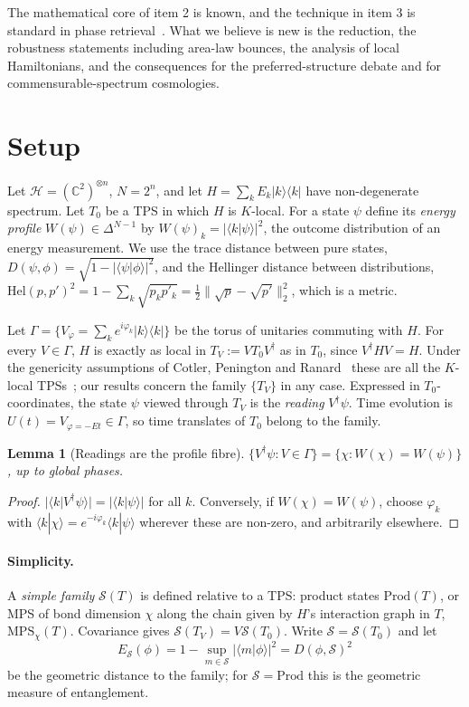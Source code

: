 \documentclass[11pt]{article}
\newtheorem{lemma}[theorem]{Lemma}
\theoremstyle{definition}
\theoremstyle{remark}
\newcommand{\ket}[1]{|#1\rangle}
\newcommand{\bra}[1]{\langle #1|}
\newcommand{\braket}[2]{\langle #1|#2\rangle}
\newcommand{\Hel}{\mathrm{Hel}}
\newcommand{\Prod}{\mathrm{Prod}}
\newcommand{\MPS}{\mathrm{MPS}}
\begin{document}
The mathematical core of item 2 is known, and the technique in item 3 is standard in phase retrieval~\cite{BCE2006,ABDE2025}. What we believe is new is the reduction, the robustness statements including area-law bounces, the analysis of local Hamiltonians, and the consequences for the preferred-structure debate and for commensurable-spectrum cosmologies.

\section{Setup}
\label{sec:setup}

Let $\mathcal{H}=(\mathbb{C}^2)^{\otimes n}$, $N=2^n$, and let $H=\sum_k E_k\ket{k}\bra{k}$ have non-degenerate spectrum. Let $T_0$ be a TPS in which $H$ is $K$-local. For a state $\psi$ define its \emph{energy profile} $W(\psi)\in\Delta^{N-1}$ by $W(\psi)_k=|\braket{k}{\psi}|^2$, the outcome distribution of an energy measurement. We use the trace distance between pure states, $D(\psi,\phi)=\sqrt{1-|\braket{\psi}{\phi}|^2}$, and the Hellinger distance between distributions, $\Hel(p,p')^2=1-\sum_k\sqrt{p_kp'_k}=\tfrac12\|\sqrt p-\sqrt{p'}\|_2^2$, which is a metric.

Let $\Gamma=\{V_\varphi=\sum_k e^{i\varphi_k}\ket{k}\bra{k}\}$ be the torus of unitaries commuting with $H$. For every $V\in\Gamma$, $H$ is exactly as local in $T_V:=VT_0V^\dagger$ as in $T_0$, since $V^\dagger HV=H$. Under the genericity assumptions of Cotler, Penington and Ranard~\cite{CPR2019} these are all the $K$-local TPSs~\cite{Soulas2025}; our results concern the family $\{T_V\}$ in any case. Expressed in $T_0$-coordinates, the state $\psi$ viewed through $T_V$ is the \emph{reading} $V^\dagger\psi$. Time evolution is $U(t)=V_{\varphi=-Et}\in\Gamma$, so time translates of $T_0$ belong to the family.

\begin{lemma}[Readings are the profile fibre]\label{lem:fibre}
$\{V^\dagger\psi:V\in\Gamma\}=\{\chi:W(\chi)=W(\psi)\}$, up to global phases.
\end{lemma}
\begin{proof}
$|\braket{k}{V^\dagger\psi}|=|\braket{k}{\psi}|$ for all $k$. Conversely, if $W(\chi)=W(\psi)$, choose $\varphi_k$ with $\braket{k}{\chi}=e^{-i\varphi_k}\braket{k}{\psi}$ wherever these are non-zero, and arbitrarily elsewhere.
\end{proof}

\paragraph{Simplicity.} A \emph{simple family} $\mathcal{S}(T)$ is defined relative to a TPS: product states $\Prod(T)$, or MPS of bond dimension $\chi$ along the chain given by $H$'s interaction graph in $T$, $\MPS_\chi(T)$. Covariance gives $\mathcal{S}(T_V)=V\mathcal{S}(T_0)$. Write $\mathcal{S}=\mathcal{S}(T_0)$ and let
\[
E_{\mathcal S}(\phi)=1-\sup_{m\in\mathcal S}|\braket{m}{\phi}|^2=D(\phi,\mathcal S)^2
\]
be the geometric distance to the family; for $\mathcal{S}=\Prod$ this is the geometric measure of entanglement.
\end{document}
